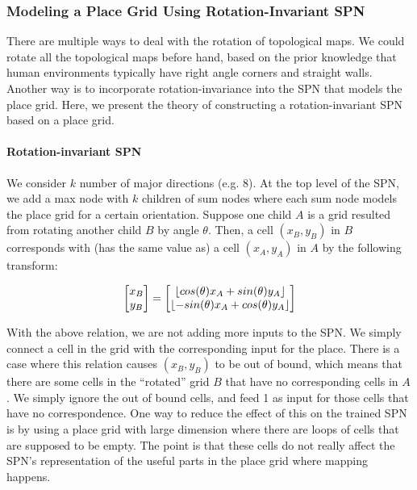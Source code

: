 \documentclass[11pt, titlepage]{article}
\theoremstyle{definition}
\DeclarePairedDelimiter\floor{\lfloor}{\rfloor}
\begin{document}
\subsubsection{Modeling a Place Grid Using Rotation-Invariant SPN}

There are multiple ways to deal with the rotation of topological maps. We could rotate all the topological maps before hand, based on the prior knowledge that human environments typically have right angle corners and straight walls. Another way is to incorporate rotation-invariance into the SPN that models the place grid. Here, we present the theory of constructing a rotation-invariant SPN based on a place grid.

\paragraph{Rotation-invariant SPN} We consider $k$ number of major directions (e.g. 8). At the top level of the SPN, we add a max node with $k$ children of sum nodes where each sum node models the place grid for a certain orientation. Suppose one child $A$ is a grid resulted from rotating another child $B$ by angle $\theta$. Then, a cell $(x_B, y_B)$ in $B$ corresponds with (has the same value as) a cell $(x_A, y_A)$ in $A$ by the following transform:

\begin{equation}
\begin{bmatrix}
x_B \\
y_B \\
\end{bmatrix}
=
\begin{bmatrix}
\floor{cos(\theta)x_A+sin(\theta)y_A}\\
\floor{-sin(\theta)x_A+cos(\theta)y_A}\\
\end{bmatrix}
\end{equation}

With the above relation, we are not adding more inputs to the SPN. We simply connect a cell in the grid with the corresponding input for the place. There is a case where this relation causes $(x_B, y_B)$ to be out of bound, which means that there are some cells in the ``rotated'' grid $B$ that have no corresponding cells in $A$. We simply ignore the out of bound cells, and feed 1 as input for those cells that have no correspondence. One way to reduce the effect of this on the trained SPN is by using a place grid with large dimension where there are loops of cells that are supposed to be empty. The point is that these cells do not really affect the SPN's representation of the useful parts in the place grid where mapping happens.
\end{document}

